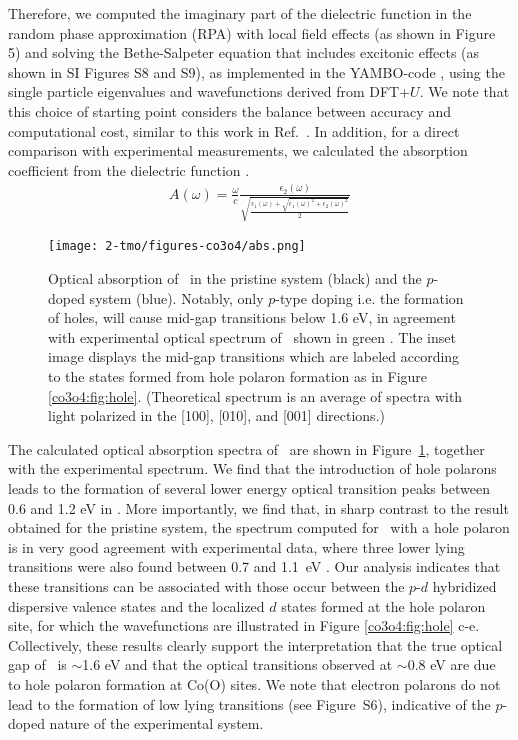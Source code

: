 Therefore, we computed the imaginary part of the dielectric function in the random phase approximation (RPA) with local field effects (as shown in Figure 5) and solving the Bethe-Salpeter equation that includes excitonic effects (as shown in SI Figures S8 and S9), as implemented in the YAMBO-code \cite{YAMBO}, using the single particle eigenvalues and wavefunctions derived from DFT+$U$. We note that this choice of starting point considers the balance between accuracy and computational cost, similar to this work in Ref.~\cite{Claudia2012}. In addition, for a direct comparison with experimental measurements, we calculated the absorption coefficient from the dielectric function \cite{jackson1999}.
%
\begin{align}
    A(\omega)=\frac{\omega}{c}\frac{\epsilon_2(\omega)}{\sqrt{\frac{\epsilon_1(\omega)+\sqrt{\epsilon_1(\omega)^2+\epsilon_2(\omega)^2}}{2}}}
\end{align}
%
\begin{figure}[t]
\begin{center}
\texttt{[image: 2-tmo/figures-co3o4/abs.png]}
\caption{Optical absorption of \co\ in the pristine system (black) and the $p$-doped system (blue). Notably, only $p$-type doping i.e. the formation of holes, will cause mid-gap transitions below 1.6 eV, in agreement with experimental optical spectrum of \co\ shown in green \cite{qiao2013}. The inset image displays the mid-gap transitions which are labeled according to the states formed from hole polaron formation as in Figure \ref{co3o4:fig:hole}.
(Theoretical spectrum is an average of spectra with light polarized in the [100], [010], and [001] directions.)}  \label{co3o4:fig:abs}
\end{center}
\end{figure}

The calculated optical absorption spectra of \co\ are shown in Figure~\ref{co3o4:fig:abs}, together with the experimental spectrum. We find that the introduction of hole polarons leads to the formation of several lower energy optical transition peaks between 0.6 and 1.2 eV in \co. More importantly, we find that, in sharp contrast to the result obtained for the pristine system, the spectrum computed for \co\ with a hole polaron is in very good agreement with experimental data, where three lower lying transitions were also found between 0.7 and 1.1~eV \cite{qiao2013,lohaus2016,jiang2014,waegele2014}. Our analysis indicates that these transitions can be associated with those occur between the $p$-$d$ hybridized dispersive valence states and the localized $d$ states formed at the hole polaron site, for which the wavefunctions are illustrated in Figure \ref{co3o4:fig:hole} c-e. Collectively, these results clearly support the interpretation that the true optical gap of \co\ is $\sim$1.6 eV and that the optical transitions observed at $\sim$0.8 eV are due to hole polaron formation at Co(O) sites.
We note that electron polarons do not lead to the formation of low lying transitions (see Figure~S6), indicative of the $p$-doped nature of the experimental system.

